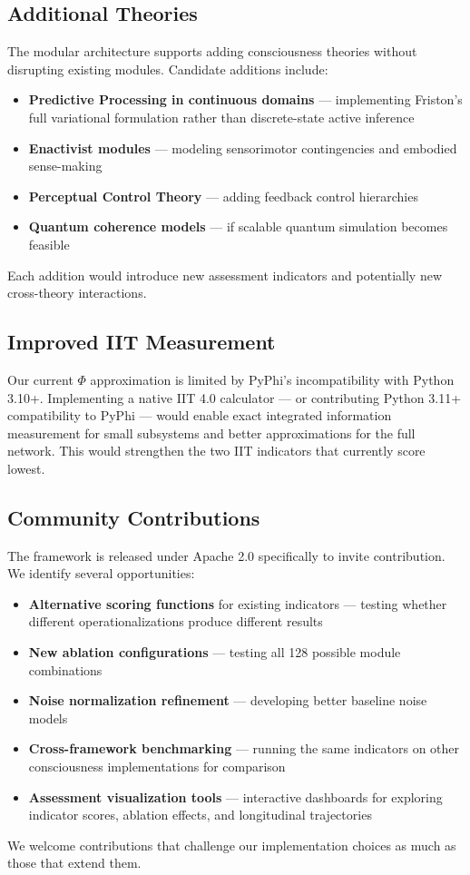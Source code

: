 \subsection{Additional Theories}

The modular architecture supports adding consciousness theories without disrupting existing modules. Candidate additions include:

\begin{itemize}
    \item \textbf{Predictive Processing in continuous domains} --- implementing Friston's full variational formulation rather than discrete-state active inference
    \item \textbf{Enactivist modules} --- modeling sensorimotor contingencies and embodied sense-making
    \item \textbf{Perceptual Control Theory} \cite{powers1973} --- adding feedback control hierarchies
    \item \textbf{Quantum coherence models} --- if scalable quantum simulation becomes feasible
\end{itemize}

Each addition would introduce new assessment indicators and potentially new cross-theory interactions.

\subsection{Improved IIT Measurement}

Our current $\Phi$ approximation is limited by PyPhi's incompatibility with Python 3.10+. Implementing a native IIT 4.0 calculator --- or contributing Python 3.11+ compatibility to PyPhi --- would enable exact integrated information measurement for small subsystems and better approximations for the full network. This would strengthen the two IIT indicators that currently score lowest.

\subsection{Community Contributions}

The framework is released under Apache 2.0 specifically to invite contribution. We identify several opportunities:

\begin{itemize}
    \item \textbf{Alternative scoring functions} for existing indicators --- testing whether different operationalizations produce different results
    \item \textbf{New ablation configurations} --- testing all 128 possible module combinations
    \item \textbf{Noise normalization refinement} --- developing better baseline noise models
    \item \textbf{Cross-framework benchmarking} --- running the same indicators on other consciousness implementations for comparison
    \item \textbf{Assessment visualization tools} --- interactive dashboards for exploring indicator scores, ablation effects, and longitudinal trajectories
\end{itemize}

We welcome contributions that challenge our implementation choices as much as those that extend them.
